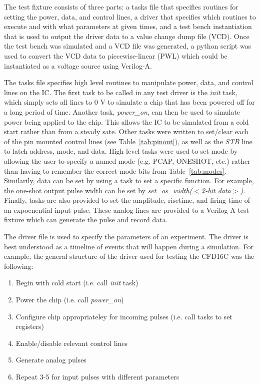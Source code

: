 \documentclass[12pt,oneside,final]{siuethesis}
\theoremstyle{definition}
\begin{document}
\par The test fixture consists of three parts: a tasks file that specifies routines for setting the power, data, and control lines, a driver that specifies which routines to execute and with what parameters at given times, and a test bench instantiation that is used to output the driver data to a value change dump file (VCD). Once the test bench was simulated and a VCD file was generated, a python script was used to convert the VCD data to piecewise-linear (PWL) which could be instantiated as a voltage source using Verilog-A.
\par The tasks file specifies high level routines to manipulate power, data, and control lines on the IC. The first task to be called in any test driver is the \emph{init} task, which simply sets all lines to 0 V to simulate a chip that has been powered off for a long period of time. Another task, \emph{power\_on}, can then be used to simulate power being applied to the chip. This allows the IC to be simulated from a cold start rather than from a steady sate. Other tasks were written to set/clear each of the pin mounted control lines (see Table~\ref{tab:pinout}), as well as the \emph{STB} line to latch address, mode, and data. High level tasks were used to set mode by allowing the user to specify a named mode (e.g. PCAP, ONESHOT, etc.) rather than having to remember the correct mode bits from Table~\ref{tab:modes}. Similarily, data can be set by using a task to set a specific function. For example, the one-shot output pulse width can be set by \emph{set\_os\_width($<$2-bit data$>$)}. Finally, tasks are also provided to set the amplitude, risetime, and firing time of an expoenential input pulse. These analog lines are provided to a Verilog-A test fixture which can generate the pulse and record data.
\par The driver file is used to specify the parameters of an experiment. The driver is best understood as a timeline of events that will happen during a simulation. For example, the general structure of the driver used for testing the CFD16C was the following:

\begin{enumerate}
\item Begin with cold start (i.e. call \emph{init} task)
\item Power the chip (i.e. call \emph{power\_on})
\item Configure chip appropriateley for incoming pulses (i.e. call tasks to set registers)
\item Enable/disable relevant control lines
\item Generate analog pulses
\item Repeat 3-5 for input pulses with different parameters
\end{enumerate}
\end{document}

